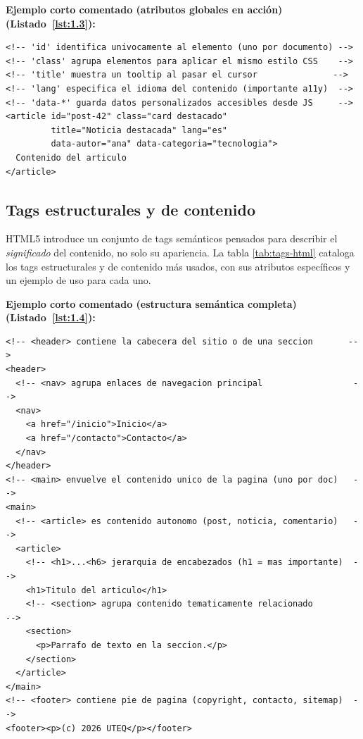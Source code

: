 \textbf{Ejemplo corto comentado (atributos globales en acción) (Listado~\ref{lst:1.3}):}
\begin{lstlisting}[language=HTML5,numbers=none,caption={Ejemplo de HTML},label=lst:1.3]
<!-- 'id' identifica univocamente al elemento (uno por documento) -->
<!-- 'class' agrupa elementos para aplicar el mismo estilo CSS    -->
<!-- 'title' muestra un tooltip al pasar el cursor               -->
<!-- 'lang' especifica el idioma del contenido (importante a11y)  -->
<!-- 'data-*' guarda datos personalizados accesibles desde JS     -->
<article id="post-42" class="card destacado"
         title="Noticia destacada" lang="es"
         data-autor="ana" data-categoria="tecnologia">
  Contenido del articulo
</article>
\end{lstlisting}

\subsection{Tags estructurales y de contenido}

HTML5 introduce un conjunto de tags semánticos pensados para
describir el \emph{significado} del contenido, no solo su apariencia.
La tabla \ref{tab:tags-html} cataloga los tags estructurales y de contenido más usados, con sus atributos específicos y un ejemplo de uso para cada uno.

\textbf{Ejemplo corto comentado (estructura semántica completa) (Listado~\ref{lst:1.4}):}

\begin{lstlisting}[language=HTML5,numbers=none,caption={Ejemplo de HTML},label=lst:1.4]
<!-- <header> contiene la cabecera del sitio o de una seccion       -->
<header>
  <!-- <nav> agrupa enlaces de navegacion principal                  -->
  <nav>
    <a href="/inicio">Inicio</a>
    <a href="/contacto">Contacto</a>
  </nav>
</header>
<!-- <main> envuelve el contenido unico de la pagina (uno por doc)   -->
<main>
  <!-- <article> es contenido autonomo (post, noticia, comentario)   -->
  <article>
    <!-- <h1>...<h6> jerarquia de encabezados (h1 = mas importante)  -->
    <h1>Titulo del articulo</h1>
    <!-- <section> agrupa contenido tematicamente relacionado         -->
    <section>
      <p>Parrafo de texto en la seccion.</p>
    </section>
  </article>
</main>
<!-- <footer> contiene pie de pagina (copyright, contacto, sitemap)  -->
<footer><p>(c) 2026 UTEQ</p></footer>
\end{lstlisting}

